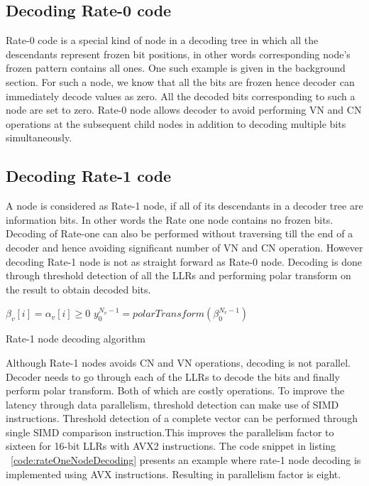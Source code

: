 \subsection{Decoding Rate-0 code}
Rate-0 code is a special kind of node in a decoding tree in which all the descendants represent frozen bit positions, in other words corresponding node's frozen pattern contains all ones. One such example is given in the background section. For such a node, we know that all the bits are frozen hence decoder can immediately decode values as zero. All the decoded bits corresponding to such a node are set to zero. Rate-0 node allows decoder to avoid performing VN and CN operations at the subsequent child nodes in addition to decoding multiple bits simultaneously.

\subsection{Decoding Rate-1 code}
A node is considered as Rate-1 node, if all of its descendants in a decoder tree are information bits. In other words the Rate one node contains no frozen bits. Decoding of Rate-one can also be performed without traversing till the end of a decoder and hence avoiding significant number of VN and CN operation. However decoding Rate-1 node is not as straight forward as Rate-0 node. Decoding is done through threshold detection of all the LLRs and performing polar transform on the result to obtain decoded bits.

\IncMargin{1.5em}
\begin{algorithm}[]
	 {
		 {
			$\beta_{v}[i] = \alpha_{v}[i] \ge 0$\;
		}
		$y_{0}^{N_v-1} = polarTransform(\beta_{0}^{N_v-1})$ \;
	}
	\caption{Rate-1 node decoding algorithm}
	\label{algo:R1Decoding}
\end{algorithm}
\DecMargin{1.5em}

Although Rate-1 nodes avoids CN and VN operations, decoding is not parallel. Decoder needs to go through each of the LLRs to decode the bits and finally perform polar transform. Both of which are costly operations. To improve the latency through data parallelism, threshold detection can make use of SIMD instructions. Threshold detection of a complete vector can be performed through single SIMD comparison instruction.This improves the parallelism factor to sixteen for 16-bit LLRs with {AVX2} instructions. The code snippet in listing ~\ref{code:rateOneNodeDecoding} presents an example where rate-1 node decoding is implemented using AVX instructions. Resulting in parallelism factor is eight.

